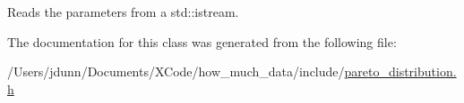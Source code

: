 Reads the parameters from a std\+::istream. 



The documentation for this class was generated from the following file\+:\begin{DoxyCompactItemize}
\item 
/\+Users/jdunn/\+Documents/\+X\+Code/how\+\_\+much\+\_\+data/include/\mbox{\hyperlink{pareto__distribution_8h}{pareto\+\_\+distribution.\+h}}\end{DoxyCompactItemize}
